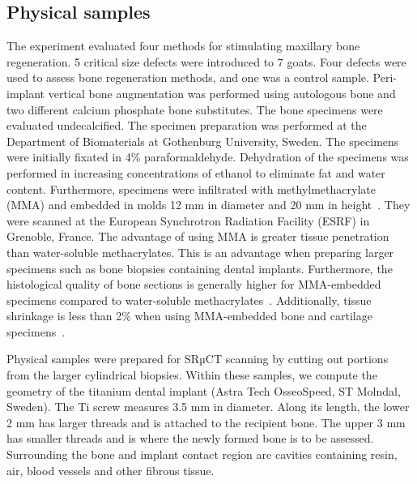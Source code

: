 \subsection{Physical samples}

The experiment evaluated four methods for stimulating maxillary bone
regeneration. 5 critical size defects were introduced to 7 goats. Four defects
were used to assess bone regeneration methods, and one was a control sample.
Peri-implant vertical bone augmentation was performed using autologous bone and
two different calcium phosphate bone substitutes. The bone specimens were
evaluated undecalcified. The specimen preparation was performed at the
Department of Biomaterials at Gothenburg University, Sweden. The specimens were
initially fixated in 4\% paraformaldehyde. Dehydration of the specimens was
performed in increasing concentrations of ethanol to eliminate fat and water
content. Furthermore, specimens were infiltrated with methylmethacrylate (MMA)
and embedded in molds 12 mm in diameter and 20 mm in
height~\cite{NELDAM2015682}. They were scanned at the European Synchrotron
Radiation Facility (ESRF) in Grenoble, France. The advantage of using MMA is
greater tissue penetration than water-soluble methacrylates. This is an
advantage when preparing larger specimens such as bone biopsies containing
dental implants. Furthermore, the histological quality of bone sections is
generally higher for MMA-embedded specimens compared to water-soluble
methacrylates~\cite{erben1997}. Additionally, tissue shrinkage is less than 2\%
when using MMA-embedded bone and cartilage specimens~\cite{ferguson1999}.

Physical samples were prepared for SRµCT scanning by cutting out portions from
the larger cylindrical biopsies. Within these samples, we compute the geometry
of the titanium dental implant (Astra Tech OsseoSpeed, ST Molndal, Sweden). The
Ti screw measures 3.5 mm in diameter. Along its length, the lower 2 mm has
larger threads and is attached to the recipient bone. The upper 3 mm has
smaller threads and is where the newly formed bone is to be assessed.
Surrounding the bone and implant contact region are cavities containing resin,
air, blood vessels and other fibrous tissue.

